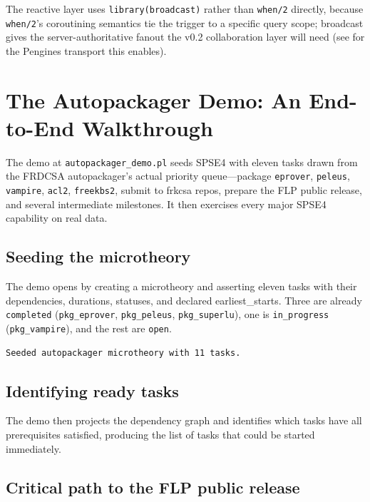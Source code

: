 \documentclass[11pt,letterpaper]{article}
\begin{document}
The reactive layer uses \texttt{library(broadcast)} rather than
\texttt{when/2} directly, because \texttt{when/2}'s coroutining semantics
tie the trigger to a specific query scope; broadcast gives the
server-authoritative fanout the v0.2 collaboration layer will need (see
\citet{lager-pengines-2014} for the Pengines transport this enables).

\section{The Autopackager Demo: An End-to-End Walkthrough}
\label{sec:demo}

The demo at \texttt{autopackager\_demo.pl} seeds SPSE4 with eleven tasks
drawn from the FRDCSA autopackager's actual priority queue---package
\texttt{eprover}, \texttt{peleus}, \texttt{vampire}, \texttt{acl2},
\texttt{freekbs2}, submit to frkcsa repos, prepare the FLP public release, and
several intermediate milestones. It then exercises every major SPSE4
capability on real data.

\subsection{Seeding the microtheory}

The demo opens by creating a microtheory and asserting eleven tasks with
their dependencies, durations, statuses, and declared earliest\_starts.
Three are already \texttt{completed} (\texttt{pkg\_eprover},
\texttt{pkg\_peleus}, \texttt{pkg\_superlu}), one is \texttt{in\_progress}
(\texttt{pkg\_vampire}), and the rest are \texttt{open}.

\begin{lstlisting}
Seeded autopackager microtheory with 11 tasks.
\end{lstlisting}

\subsection{Identifying ready tasks}

The demo then projects the dependency graph and identifies which tasks
have all prerequisites satisfied, producing the list of tasks that could
be started immediately.

\subsection{Critical path to the FLP public release}
\end{document}
